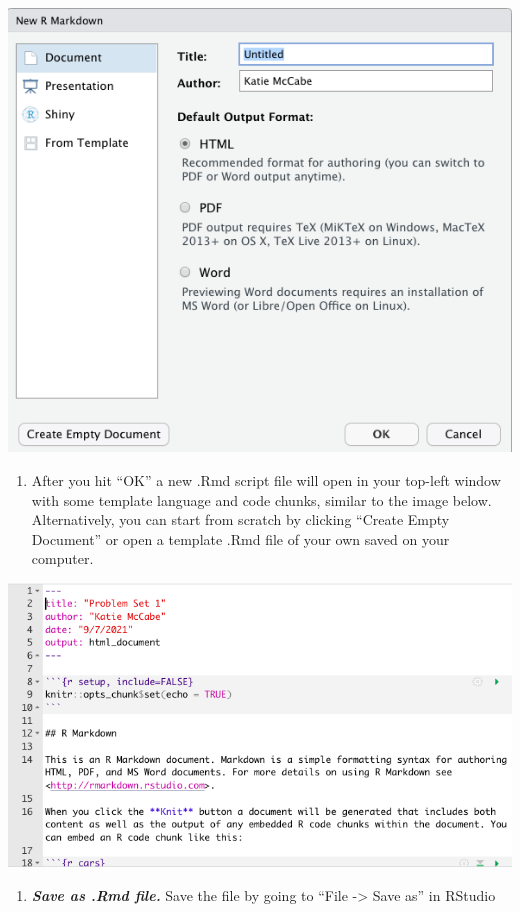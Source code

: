 \documentclass[
  letterpaper,
  DIV=11,
  numbers=noendperiod]{scrreprt}
\providecommand{\tightlist}{%
  \setlength{\itemsep}{0pt}\setlength{\parskip}{0pt}}\usepackage{longtable,booktabs,array}
\begin{document}
\includegraphics{images/rmarkdownnewfile.png}

\begin{enumerate}
\def\labelenumi{\arabic{enumi}.}
\setcounter{enumi}{2}
\tightlist
\item
  After you hit ``OK'' a new .Rmd script file will open in your top-left
  window with some template language and code chunks, similar to the
  image below. Alternatively, you can start from scratch by clicking
  ``Create Empty Document'' or open a template .Rmd file of your own
  saved on your computer.
\end{enumerate}

\includegraphics{images/rmarkdowntemplate.png}

\begin{enumerate}
\def\labelenumi{\arabic{enumi}.}
\setcounter{enumi}{3}
\tightlist
\item
  \textbf{\emph{Save as .Rmd file.}} Save the file by going to ``File
  -\textgreater{} Save as'' in RStudio
\end{enumerate}
\end{document}
